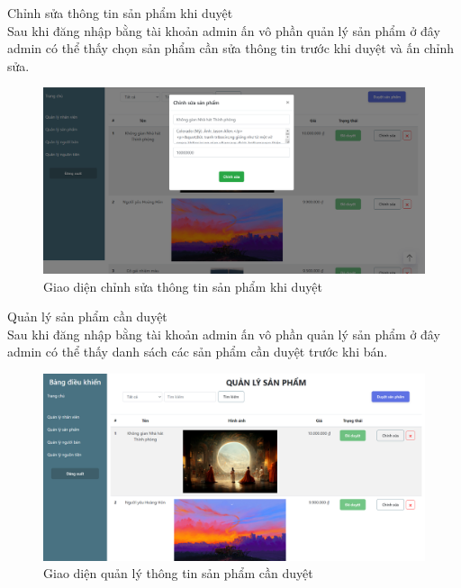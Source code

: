 \documentclass{article}
\begin{document}
{{{{{{{{{{{{{{{{{\begin{center}
\begin{figure}[htp]
		\end{figure}
	\end{center}
}
\newpage
{\large  
	\indent Chỉnh sửa thông tin sản phẩm khi duyệt\\
	{\large
		Sau khi đăng nhập bằng tài khoản admin ấn vô phần quản lý sản phẩm  ở đây admin có thể thấy chọn sản phẩm cần sửa thông tin trước khi duyệt và ấn chỉnh sửa.}
	\begin{center}
		\begin{figure}[htp]
			\begin{center}
				\includegraphics[scale=.400]{anh43.png}
			\end{center}
			\caption{Giao diện chỉnh sửa thông tin sản phẩm khi duyệt}
			
		\end{figure}
	\end{center}
}

\newpage
{\large  
	\indent Quản lý sản phẩm cần duyệt\\
	{\large
		Sau khi đăng nhập bằng tài khoản admin ấn vô phần quản lý sản phẩm ở đây admin có thể thấy danh sách các sản phẩm cần duyệt trước khi bán.}
	\begin{center}
		\begin{figure}[htp]
			\begin{center}
				\includegraphics[scale=.400]{anh44.png}
			\end{center}
			\caption{Giao diện quản lý thông tin sản phẩm cần duyệt}
			

\end{figure}
\end{center}}}}}}}}}}}}}}}}}}
\end{document}

